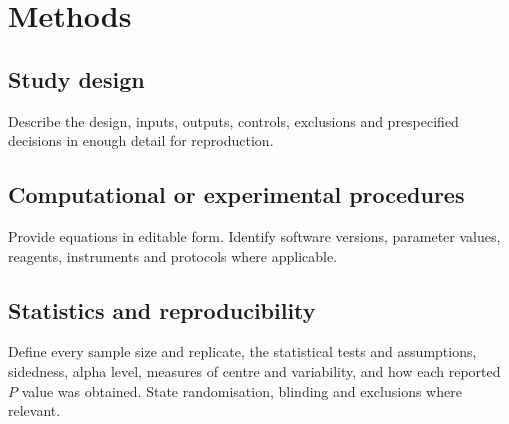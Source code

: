 \section*{Methods}

\subsection*{Study design}

Describe the design, inputs, outputs, controls, exclusions and prespecified decisions in enough detail for reproduction.

\subsection*{Computational or experimental procedures}

Provide equations in editable form. Identify software versions, parameter values, reagents, instruments and protocols where applicable.

\subsection*{Statistics and reproducibility}

Define every sample size and replicate, the statistical tests and assumptions, sidedness, alpha level, measures of centre and variability, and how each reported $P$ value was obtained. State randomisation, blinding and exclusions where relevant.
